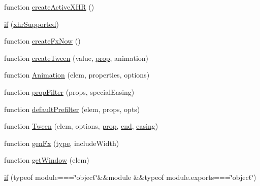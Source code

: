 \begin{DoxyCompactItemize}
\item 
function \hyperlink{packages_2j_query_81_810_82_2_content_2_scripts_2jquery-1_810_82_8js_a54bf63f1b5f905292db45a1d6a9dc300}{create\+Active\+X\+H\+R} ()
\item 
\hyperlink{packages_2j_query_81_810_82_2_content_2_scripts_2jquery-1_810_82_8js_ae2dd433d7bb020adf83db5351a0671e1}{if} (\hyperlink{packages_2j_query_81_810_82_2_content_2_scripts_2jquery-1_810_82_8js_afd7e72f2f357a5a8b17e46776a6283eb}{xhr\+Supported})
\item 
function \hyperlink{packages_2j_query_81_810_82_2_content_2_scripts_2jquery-1_810_82_8js_a3c7bcef859b0811abb1dbf890c6cc635}{create\+Fx\+Now} ()
\item 
function \hyperlink{packages_2j_query_81_810_82_2_content_2_scripts_2jquery-1_810_82_8js_a0c2043fcd2fa684768877127fbbc2e55}{create\+Tween} (value, \hyperlink{jquery-1_810_82-vsdoc_8js_af17be84954030af6c2286f5da385d41b}{prop}, animation)
\item 
function \hyperlink{packages_2j_query_81_810_82_2_content_2_scripts_2jquery-1_810_82_8js_aa33f7dcb8ee41587d545a0bc69849296}{Animation} (elem, properties, options)
\item 
function \hyperlink{packages_2j_query_81_810_82_2_content_2_scripts_2jquery-1_810_82_8js_a0196d1f08ae60b747901b5a2950f72f1}{prop\+Filter} (props, special\+Easing)
\item 
function \hyperlink{packages_2j_query_81_810_82_2_content_2_scripts_2jquery-1_810_82_8js_a8041b1040535dcee84ad474aaaf11dde}{default\+Prefilter} (elem, props, opts)
\item 
function \hyperlink{packages_2j_query_81_810_82_2_content_2_scripts_2jquery-1_810_82_8js_adcb517ce3709049d37bb5f5bd3811edf}{Tween} (elem, options, \hyperlink{jquery-1_810_82-vsdoc_8js_af17be84954030af6c2286f5da385d41b}{prop}, \hyperlink{jquery-1_810_82-vsdoc_8js_af2ce7c86b4e6e9d61f85745258f4ef32}{end}, \hyperlink{packages_2j_query_81_810_82_2_content_2_scripts_2jquery-1_810_82_8js_a9758a312629fa6de1744280dd6e6253b}{easing})
\item 
function \hyperlink{packages_2j_query_81_810_82_2_content_2_scripts_2jquery-1_810_82_8js_a0dad9ae6c57fd32a071de202faa87081}{gen\+Fx} (\hyperlink{jquery-1_810_82-vsdoc_8js_a3940565e83a9bfd10d95ffd27536da91}{type}, include\+Width)
\item 
function \hyperlink{packages_2j_query_81_810_82_2_content_2_scripts_2jquery-1_810_82_8js_ab8e6e1fb3b8b51b6afe437c63df0e09f}{get\+Window} (elem)
\item 
\hyperlink{packages_2j_query_81_810_82_2_content_2_scripts_2jquery-1_810_82_8js_aa2cebb51f03a2e3ab2af45a3f9241c96}{if} (typeof module===\char`\"{}object\char`\"{}\&\&module \&\&typeof module.\+exports===\char`\"{}object\char`\"{})
\end{DoxyCompactItemize}
